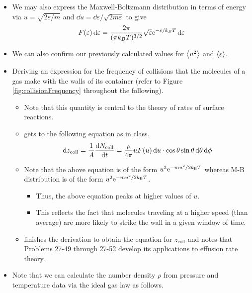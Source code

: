\documentclass[../notes.tex]{subfiles}
\begin{document}
\begin{itemize}
\begin{itemize}
    \end{itemize}
    \item We may also express the Maxwell-Boltzmann distribution in terms of energy via $u=\sqrt{2\varepsilon/m}$ and $\dd{u}=\dd{\varepsilon}/\sqrt{2m\varepsilon}$ to give
    \begin{equation*}
        F(\varepsilon)\dd{\varepsilon} = \frac{2\pi}{(\pi k_BT)^{3/2}}\sqrt{\varepsilon}\e[-\varepsilon/k_BT]\dd{\varepsilon}
    \end{equation*}
    \item We can also confirm our previously calculated values for $\prb{u^2}$ and $\prb{\varepsilon}$.
    \item {}Deriving an expression for the frequency of collisions that the molecules of a gas make with the walls of its container (refer to Figure \ref{fig:collisionFrequency} throughout the following).
    \begin{itemize}
        \item Note that this quantity is central to the theory of rates of surface reactions.
        \item \textcite{bib:McQuarrieSimon} gets to the following equation as in class.
        \begin{equation*}
            \dd{z_\text{coll}} = \frac{1}{A}\dv{N_\text{coll}}{t}
            = \frac{\rho}{4\pi}uF(u)\dd{u}\cdot\cos\theta\sin\theta\dd{\theta}\dd{\phi}
        \end{equation*}
        \item Note that the above equation is of the form $u^3\e[-mu^2/2\kB T]$ whereas M-B distribution is of the form $u^2\e[-mu^2/2\kB T]$.
        \begin{itemize}
            \item Thus, the above equation peaks at higher values of $u$.
            \item This reflects the fact that molecules traveling at a higher speed (than average) are more likely to strike the wall in a given window of time.
        \end{itemize}
        \item \textcite{bib:McQuarrieSimon} finishes the derivation to obtain the equation for $z_\text{coll}$ and notes that Problems 27-49 through 27-52 develop its applications to effusion rate theory.
    \end{itemize}
    \item Note that we can calculate the number density $\rho$ from pressure and temperature data via the ideal gas law as follows.

\end{itemize}
\end{document}
